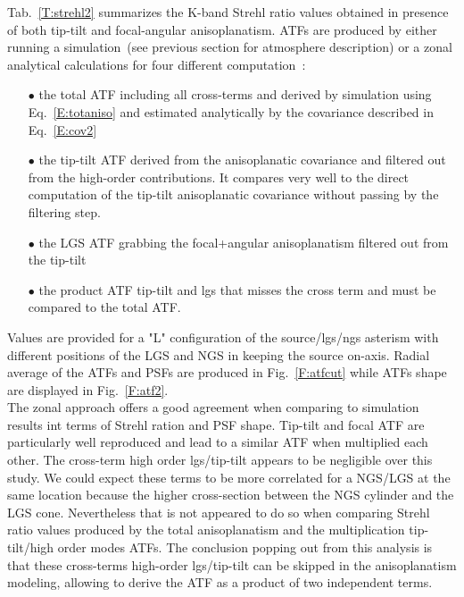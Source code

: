 \documentclass[12pt]{article}
\begin{document}
Tab.~\ref{T:strehl2} summarizes the K-band Strehl ratio values obtained in presence of both tip-tilt and focal-angular anisoplanatism. ATFs are produced by either running a simulation~(see previous section for atmosphere description) or a zonal analytical calculations for four different computation~:
\begin{itemize}
	\item[$\bullet$]  the total ATF including all cross-terms and derived by simulation using Eq.~\ref{E:totaniso} and estimated analytically by the covariance described in Eq.~\ref{E:cov2}
	\item[$\bullet$] the tip-tilt ATF derived from the anisoplanatic covariance and filtered out from the high-order contributions. It compares very well to the direct computation of the tip-tilt anisoplanatic covariance without passing by the filtering step.
	\item[$\bullet$] the LGS ATF grabbing the focal+angular anisoplanatism filtered out from the tip-tilt
	\item[$\bullet$] the product ATF tip-tilt and lgs that misses the cross term and must be compared to the total ATF.	
\end{itemize}

Values are provided for a "L" configuration of the source/lgs/ngs asterism with different positions of the LGS and NGS in keeping the source on-axis. Radial average of the ATFs and PSFs are produced in Fig.~\ref{F:atfcut} while ATFs shape are displayed in Fig.~\ref{F:atf2}.\\

The zonal approach offers a good agreement when comparing to simulation results int terms of Strehl ration and PSF shape. Tip-tilt and focal ATF are particularly well reproduced and lead to a similar ATF when multiplied each other. The cross-term high order lgs/tip-tilt appears to be negligible over this study. We could expect these terms to be more correlated for a NGS/LGS at the same location because the higher cross-section between the NGS cylinder and the LGS cone. Nevertheless that is not appeared to do so when comparing Strehl ratio values produced by the total anisoplanatism and the multiplication tip-tilt/high order modes ATFs. The conclusion popping out from this analysis is that these cross-terms high-order lgs/tip-tilt can be skipped in the anisoplanatism modeling, allowing to derive the ATF as a product of two independent terms.
\end{document}
